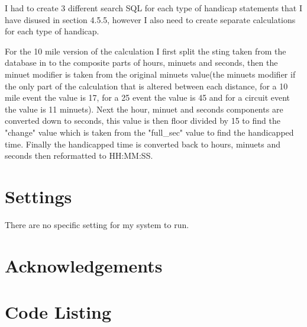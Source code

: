 I had to create 3 different search SQL for each type of handicap statements that I have disused in section 4.5.5, however I also need to create separate calculations for each type of handicap.


For the 10 mile version of the calculation I first split the sting taken from the database in to the composite parts of hours, minuets and seconds, then the minuet modifier is taken from the original minuets value(the minuets modifier if the only part of the calculation that is altered between each distance, for a 10 mile event the value is 17, for a 25 event the value is 45 and for a circuit event the value is 11 minuets). Next the hour, minuet and seconds components are converted down to seconds, this value is then floor divided by 15 to find the "change" value which is taken from the "full\_sec" value to find the handicapped time. Finally the handicapped time is converted back to hours, minuets and seconds then reformatted to HH:MM:SS.
\section{Settings}
There are no specific setting for my system to run.
\section{Acknowledgements}

\section{Code Listing}

